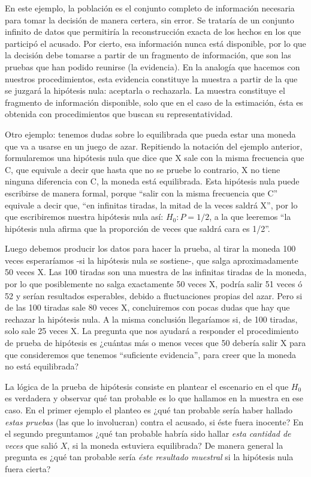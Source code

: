\documentclass[]{book}
\begin{document}
En este ejemplo, la población es el conjunto completo de información
necesaria para tomar la decisión de manera certera, sin error. Se
trataría de un conjunto infinito de datos que permitiría la
reconstrucción exacta de los hechos en los que participó el acusado. Por
cierto, esa información nunca está disponible, por lo que la decisión
debe tomarse a partir de un fragmento de información, que son las
pruebas que han podido reunirse (la evidencia). En la analogía que
hacemos con nuestros procedimientos, esta evidencia constituye la
muestra a partir de la que se juzgará la hipótesis nula: aceptarla o
rechazarla. La muestra constituye el fragmento de información
disponible, solo que en el caso de la estimación, ésta es obtenida con
procedimientos que buscan su representatividad.

Otro ejemplo: tenemos dudas sobre lo equilibrada que pueda estar una
moneda que va a usarse en un juego de azar. Repitiendo la notación del
ejemplo anterior, formularemos una hipótesis nula que dice que X sale
con la misma frecuencia que C, que equivale a decir que hasta que no se
pruebe lo contrario, X no tiene ninguna diferencia con C, la moneda está
equilibrada. Esta hipótesis nula puede escribirse de manera formal,
porque ``salir con la misma frecuencia que C'' equivale a decir que, ``en
infinitas tiradas, la mitad de la veces saldrá X'', por lo que
escribiremos nuestra hipótesis nula así: \(H_0: P=1/2\), a la que leeremos
``la hipótesis nula afirma que la proporción de veces que saldrá cara es
1/2''.

Luego debemos producir los datos para hacer la prueba, al tirar la
moneda 100 veces esperaríamos -si la hipótesis nula se sostiene-, que
salga aproximadamente 50 veces X. Las 100 tiradas son una muestra de las
infinitas tiradas de la moneda, por lo que posiblemente no salga
exactamente 50 veces X, podría salir 51 veces ó 52 y serían resultados
esperables, debido a fluctuaciones propias del azar. Pero si de las 100
tiradas sale 80 veces X, concluiremos con pocas dudas que hay que
rechazar la hipótesis nula. A la misma conclusión llegaríamos si, de 100
tiradas, solo sale 25 veces X. La pregunta que nos ayudará a responder
el procedimiento de prueba de hipótesis es ¿cuántas más o menos veces
que 50 debería salir X para que consideremos que tenemos ``suficiente
evidencia'', para creer que la moneda no está equilibrada?

La lógica de la prueba de hipótesis consiste en plantear el escenario en el que \(H_{0}\) es verdadera y observar qué tan probable es lo que hallamos en la muestra en ese caso. En el primer ejemplo el planteo es ¿qué tan probable sería haber hallado \emph{estas pruebas} (las que lo involucran) contra el acusado, si éste fuera inocente? En el segundo preguntamos ¿qué tan probable habría sido hallar \emph{esta cantidad de veces} que salió \(X\), si la moneda estuviera equilibrada? De manera general la pregunta es ¿qué tan probable sería \emph{éste resultado muestral} si la hipótesis nula fuera cierta?
\end{document}
